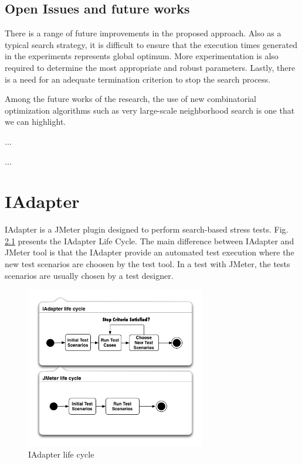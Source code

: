 \documentclass{report}
\begin{document}
\section{Open Issues and future works}

There is a range of future improvements in the proposed approach. Also as a typical search strategy, it is difficult to ensure that the execution times generated in the experiments represents global optimum. More experimentation is also required to determine the
most appropriate and robust parameters. Lastly, there is a need for an adequate termination criterion to stop the search process.


Among the future works of the research, the use of new combinatorial optimization algorithms such as very large-scale neighborhood search is one that we can highlight. 

...
\appendix

...



\chapter{IAdapter }



IAdapter is a JMeter plugin designed to perform search-based stress tests. Fig. \ref{fig:iadapterlifecycle} presents the IAdapter Life Cycle. The main difference between IAdapter and JMeter tool is that the IAdapter provide an automated test execution where the new test scenarios are choosen by the test tool.  In a test with JMeter, the tests scenarios are usually chosen by a test designer.

\begin{figure}[h]
\centering
\includegraphics[width=0.7\textwidth]{./images/lifecycle2.png}
\caption{IAdapter life cycle}
\label{fig:iadapterlifecycle}
\end{figure}
\end{document}
